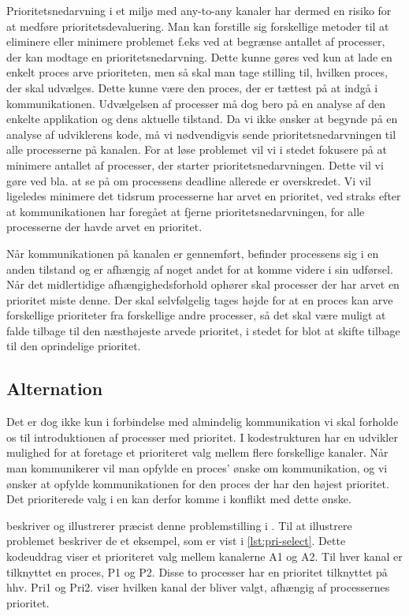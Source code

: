 Prioritetsnedarvning i et miljø med any-to-any kanaler har dermed en risiko for at medføre prioritetsdevaluering. Man kan forstille sig forskellige metoder til at eliminere eller minimere problemet f.eks ved at begrænse antallet af processer, der kan modtage en prioritetsnedarvning. Dette kunne gøres ved kun at lade en enkelt proces arve prioriteten,  men så skal man tage stilling til, hvilken proces, der skal udvælges. Dette kunne være den proces, der er tættest på at indgå i kommunikationen.  Udvælgelsen af processer må dog bero på en analyse af den enkelte applikation og dens aktuelle tilstand. Da vi ikke ønsker at begynde på en analyse af udviklerens kode, må vi nødvendigvis sende prioritetsnedarvningen til alle processerne på kanalen. For at løse problemet vil vi i stedet fokusere på at minimere antallet af processer, der starter prioritetsnedarvningen. Dette vil vi gøre ved bla. at se på om processens deadline allerede er overskredet. Vi vil ligeledes minimere det tidsrum processerne har arvet en prioritet, ved straks efter at kommunikationen har foregået at fjerne prioritetsnedarvningen, for alle processerne der havde arvet en prioritet.

Når kommunikationen på kanalen er gennemført, befinder processens sig i en anden tilstand og er afhængig af noget andet for at komme videre i sin udførsel. 
Når det midlertidige afhængighedsforhold ophører skal processer der har arvet en prioritet miste denne. Der skal selvfølgelig tages højde for at en proces kan arve forskellige prioriteter fra forskellige andre processer, så det skal være muligt at falde tilbage til den næsthøjeste arvede prioritet, i stedet for blot at skifte tilbage til den oprindelige prioritet. 

\subsection{Alternation}\label{misc:kanal-prioritet}
Det er dog ikke kun i forbindelse med almindelig kommunikation vi skal forholde os til introduktionen af processer med prioritet. I kodestrukturen 
har en udvikler mulighed for at foretage et  prioriteret valg mellem flere forskellige kanaler. Når man kommunikerer vil man opfylde en proces' ønske om kommunikation, og vi ønsker at opfylde kommunikationen for den proces der har den højest prioritet. Det prioriterede valg i en  kan derfor komme i konflikt med dette ønske.

  
\citeauthor{Burns1990} beskriver og illustrerer præcist denne problemstilling i \cite{Burns1990}. Til at illustrere problemet beskriver de et eksempel, som er vist i \cref{lst:pri-select}. Dette kodeuddrag viser et prioriteret valg mellem kanalerne A1 og A2. Til hver kanal er tilknyttet en proces, P1 og P2. Disse to processer har en prioritet tilknyttet på hhv.  Pri1 og Pri2.  viser hvilken kanal der bliver valgt, afhængig af processernes prioritet.

